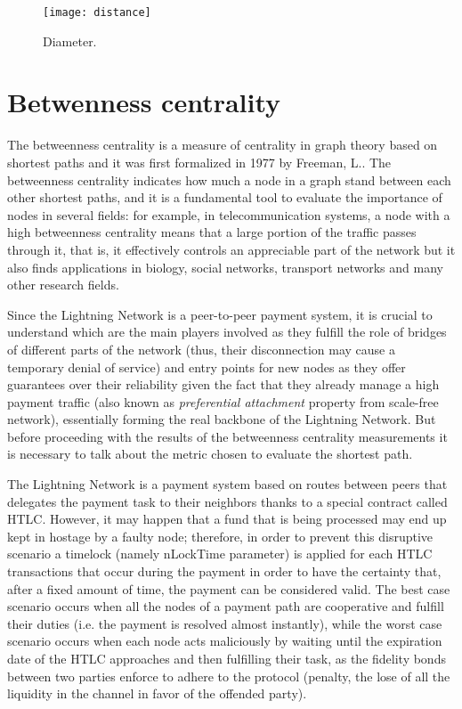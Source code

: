 	\begin{figure}
		\centering
		\texttt{[image: distance]}
		\caption{Diameter.}
		\label{monthly_diameter}
	\end{figure}

	\section{Betwenness	centrality}
	
	The betweenness centrality is a measure of centrality in graph theory based on shortest paths and it was first formalized in 1977 by Freeman, L.\cite{Freeman1977}. The betweenness centrality indicates how much a node in a graph stand between each other shortest paths, and it is a fundamental tool to evaluate the importance of nodes in several fields: for example, in telecommunication systems, a node with a high betweenness centrality means that a large portion of the traffic passes through it, that is, it effectively controls an appreciable part of the network but it also finds applications in biology, social networks, transport networks and many other research fields. 
	
	Since the Lightning Network is a peer-to-peer payment system, it is crucial to understand which are the main players involved as they fulfill the role of bridges of different parts of the network (thus, their disconnection may cause a temporary denial of service) and entry points for new nodes as they offer guarantees over their reliability given the fact that they already manage a high payment traffic (also known as \textit{preferential attachment} property from scale-free network), essentially forming the real backbone of the Lightning Network. But before proceeding with the results of the betweenness centrality measurements it is necessary to talk about the metric chosen to evaluate the shortest path.
	
	The Lightning Network is a payment system based on routes between peers that delegates the payment task to their neighbors thanks to a special contract called HTLC. However, it may happen that a fund that is being processed may end up kept in hostage by a faulty node; therefore, in order to prevent this disruptive scenario a timelock (namely nLockTime parameter) is applied for each HTLC transactions that occur during the payment in order to have the certainty that, after a fixed amount of time, the payment can be considered valid. The best case scenario occurs when all the nodes of a payment path are cooperative and fulfill their duties (i.e. the payment is resolved almost instantly), while the worst case scenario occurs when each node acts maliciously by waiting until the expiration date of the HTLC approaches and then fulfilling their task, as the fidelity bonds between two parties enforce to adhere to the protocol (penalty, the lose of all the liquidity in the channel in favor of the offended party). 
	

